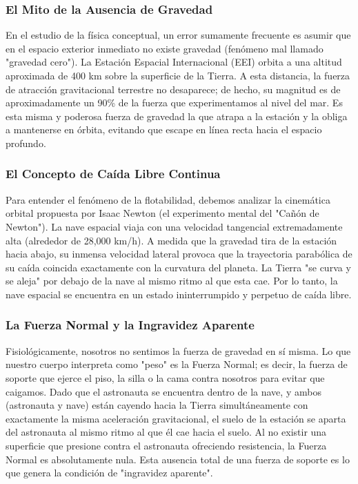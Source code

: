 \documentclass[12pt]{article}
\begin{document}
\subsubsection*{El Mito de la Ausencia de Gravedad}
En el estudio de la física conceptual, un error sumamente frecuente es asumir que en el espacio exterior inmediato no existe gravedad (fenómeno mal llamado "gravedad cero"). La Estación Espacial Internacional (EEI) orbita a una altitud aproximada de 400 km sobre la superficie de la Tierra. A esta distancia, la fuerza de atracción gravitacional terrestre no desaparece; de hecho, su magnitud es de aproximadamente un 90\% de la fuerza que experimentamos al nivel del mar. Es esta misma y poderosa fuerza de gravedad la que atrapa a la estación y la obliga a mantenerse en órbita, evitando que escape en línea recta hacia el espacio profundo.

\subsubsection*{El Concepto de Caída Libre Continua}
Para entender el fenómeno de la flotabilidad, debemos analizar la cinemática orbital propuesta por Isaac Newton (el experimento mental del "Cañón de Newton"). La nave espacial viaja con una velocidad tangencial extremadamente alta (alrededor de 28,000 km/h). A medida que la gravedad tira de la estación hacia abajo, su inmensa velocidad lateral provoca que la trayectoria parabólica de su caída coincida exactamente con la curvatura del planeta. La Tierra "se curva y se aleja" por debajo de la nave al mismo ritmo al que esta cae. Por lo tanto, la nave espacial se encuentra en un estado ininterrumpido y perpetuo de caída libre.

\subsubsection*{La Fuerza Normal y la Ingravidez Aparente}
Fisiológicamente, nosotros no sentimos la fuerza de gravedad en sí misma. Lo que nuestro cuerpo interpreta como "peso" es la Fuerza Normal; es decir, la fuerza de soporte que ejerce el piso, la silla o la cama contra nosotros para evitar que caigamos. 
Dado que el astronauta se encuentra dentro de la nave, y ambos (astronauta y nave) están cayendo hacia la Tierra simultáneamente con exactamente la misma aceleración gravitacional, el suelo de la estación se aparta del astronauta al mismo ritmo al que él cae hacia el suelo. Al no existir una superficie que presione contra el astronauta ofreciendo resistencia, la Fuerza Normal es absolutamente nula. Esta ausencia total de una fuerza de soporte es lo que genera la condición de "ingravidez aparente".
\end{document}
